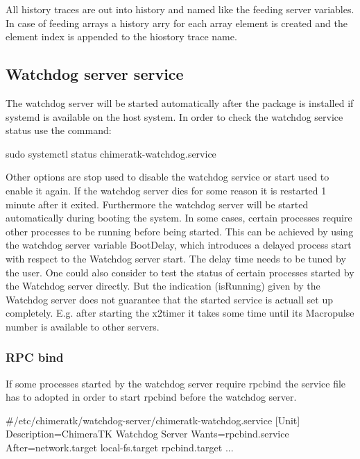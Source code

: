 All history traces are out into {\ttfamily history} and named like the feeding server variables. In case of feeding arrays a history arry for each array element is created and the element index is appended to the hiostory trace name.

\subsection*{Watchdog server service}

The watchdog server will be started automatically after the package is installed if systemd is available on the host system. In order to check the watchdog service status use the command\+: \begin{DoxyVerb}sudo systemctl status chimeratk-watchdog.service
\end{DoxyVerb}


Other options are {\ttfamily stop} used to disable the watchdog service or {\ttfamily start} used to enable it again. If the watchdog server dies for some reason it is restarted 1 minute after it exited. Furthermore the watchdog server will be started automatically during booting the system. In some cases, certain processes require other processes to be running before being started. This can be achieved by using the watchdog server variable {\ttfamily Boot\+Delay}, which introduces a delayed process start with respect to the Watchdog server start. The delay time needs to be tuned by the user. One could also consider to test the status of certain processes started by the Watchdog server directly. But the indication ({\ttfamily is\+Running}) given by the Watchdog server does not guarantee that the started service is actuall set up completely. E.\+g. after starting the x2timer it takes some time until its Macropulse number is available to other servers.

\subsubsection*{R\+PC bind}

If some processes started by the watchdog server require {\ttfamily rpcbind} the service file has to adopted in order to start {\ttfamily rpcbind} before the watchdog server. \begin{DoxyVerb}#/etc/chimeratk/watchdog-server/chimeratk-watchdog.service
[Unit]
Description=ChimeraTK Watchdog Server
Wants=rpcbind.service
After=network.target local-fs.target rpcbind.target
...
\end{DoxyVerb}


